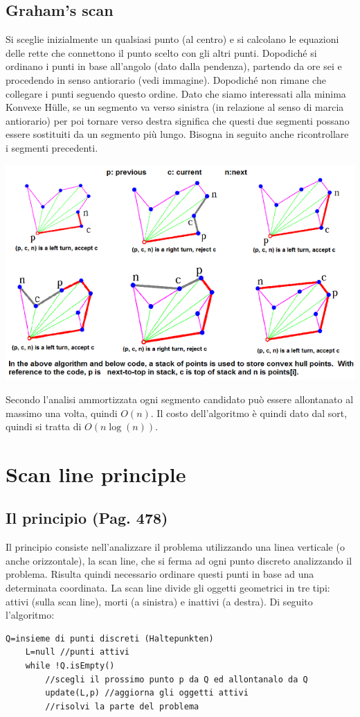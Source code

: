 \documentclass[a4paper]{book}
\newcommand{\lstIndent}{4}
\begin{document}
\subsection{Graham's scan}
Si sceglie inizialmente un qualsiasi punto (al centro) e si calcolano le equazioni delle rette che connettono il punto scelto con gli altri punti. Dopodiché si ordinano i punti in base all'angolo (dato dalla pendenza), partendo da ore sei e procedendo in senso antiorario (vedi immagine). Dopodiché non rimane che collegare i punti seguendo questo ordine. Dato che siamo interessati alla minima Konvexe Hülle, se un segmento va verso sinistra (in relazione al senso di marcia antiorario) per poi tornare verso destra significa che questi due segmenti possano essere sostituiti da un segmento più lungo. Bisogna in seguito anche ricontrollare i segmenti precedenti. 
\begin{center}
\includegraphics[scale=0.7]{Figures/graham.png}
\end{center}
Secondo l'analisi ammortizzata ogni segmento candidato può essere allontanato al massimo una volta, quindi $O(n)$. Il costo dell'algoritmo è quindi dato dal sort, quindi si tratta di $O(n\log (n))$.

\section{Scan line principle}
\subsection{Il principio (Pag. 478)}
Il principio consiste nell'analizzare il problema utilizzando una linea verticale (o anche orizzontale), la scan line, che si ferma ad ogni punto discreto analizzando il problema. Risulta quindi necessario ordinare questi punti in base ad una determinata coordinata. La scan line divide gli oggetti geometrici in tre tipi: attivi (sulla scan line), morti (a sinistra) e inattivi (a destra). Di seguito l'algoritmo:
\begin{lstlisting}[tabsize=\lstIndent]
	Q=insieme di punti discreti (Haltepunkten)
	L=null //punti attivi
	while !Q.isEmpty()
		//scegli il prossimo punto p da Q ed allontanalo da Q
		update(L,p) //aggiorna gli oggetti attivi
		//risolvi la parte del problema
\end{lstlisting}
\end{document}
